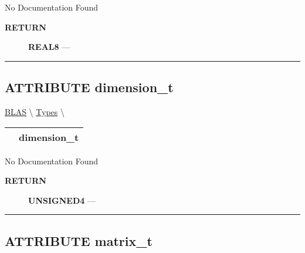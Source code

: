 \par





No Documentation Found








\par
\begin{description}
\item [\colorbox{tagtype}{\color{white} \textbf{\textsf{RETURN}}}] \textbf{REAL8} --- 
\end{description}




\rule{\linewidth}{0.5pt}
\subsection*{\textsf{\colorbox{headtoc}{\color{white} ATTRIBUTE}
dimension\_t}}

\hypertarget{ecldoc:blas.types.dimension_t}{}
\hspace{0pt} \hyperlink{ecldoc:blas}{BLAS} \textbackslash 
\hspace{0pt} \hyperlink{ecldoc:BLAS.Types}{Types} \textbackslash 

{\renewcommand{\arraystretch}{1.5}
\begin{tabularx}{\textwidth}{|>{\raggedright\arraybackslash}l|X|}
\hline
\hspace{0pt}\mytexttt{\color{red} } & \textbf{dimension\_t} \\
\hline
\end{tabularx}
}

\par





No Documentation Found








\par
\begin{description}
\item [\colorbox{tagtype}{\color{white} \textbf{\textsf{RETURN}}}] \textbf{UNSIGNED4} --- 
\end{description}




\rule{\linewidth}{0.5pt}
\subsection*{\textsf{\colorbox{headtoc}{\color{white} ATTRIBUTE}
matrix\_t}}

